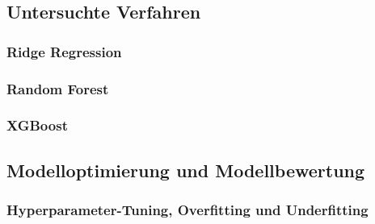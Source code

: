 \documentclass[12pt,a4paper]{article}
\begin{document}

\subsection{Untersuchte Verfahren}

\subsubsection{Ridge Regression}

\subsubsection{Random Forest}

\subsubsection{XGBoost}

\subsection{Modelloptimierung und Modellbewertung}

\subsubsection{Hyperparameter-Tuning, Overfitting und Underfitting}

\end{document}
